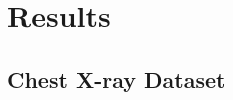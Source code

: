 \documentclass[12pt]{article}
\begin{document}










\section{Results}


\subsection{Chest X-ray Dataset}
\end{document}
